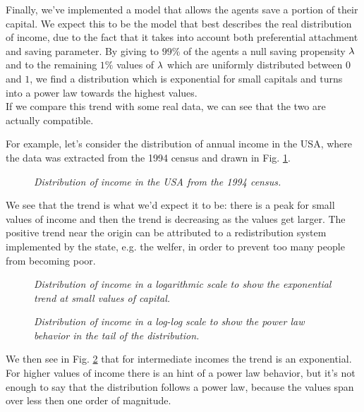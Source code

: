 Finally, we've implemented a model that allows the agents save a portion of their capital.
We expect this to be the model that best describes the real distribution of income, due to the fact that it takes into account both preferential attachment and saving parameter.
By giving to $99 \%$ of the agents a null saving propensity $\lambda$ and to the remaining $1 \%$ values of $\lambda$ which are uniformly distributed between $0$ and $1$, we find a distribution which is exponential for small capitals and turns into a power law towards the highest values. \\
If we compare this trend with some real data, we can see that the two are actually compatible.

For example, let's consider the distribution of annual income in the USA, where the data was extracted from the 1994 census and drawn in Fig. \ref{fig:gloabl_realData}.
\begin{figure}[H]
    \centering
    \scalebox{.7}{}
    \caption{\emph{Distribution of income in the USA from the 1994 census.}}
    \label{fig:gloabl_realData}
\end{figure}
We see that the trend is what we'd expect it to be: there is a peak for small values of income and then the trend is decreasing as the values get larger.
The positive trend near the origin can be attributed to a redistribution system implemented by the state, e.g. the welfer, in order to prevent too many people from becoming poor. \\
\begin{figure}[H]
    \centering
    \scalebox{.7}{}
    \caption{\emph{Distribution of income in a logarithmic scale to show the exponential trend at small values of capital.}}
    \label{fig:real_head}
\end{figure}
\begin{figure}[H]
    \centering
    \scalebox{.7}{}
    \caption{\emph{Distribution of income in a log-log scale to show the power law behavior in the tail of the distribution.}}
    \label{fig:real_tail}
\end{figure}
We then see in Fig. \ref{fig:real_head} that for intermediate incomes the trend is an exponential. For higher values of income there is an hint of a power law behavior, but it's not enough to say that the distribution follows a power law, because the values span over less then one order of magnitude.

